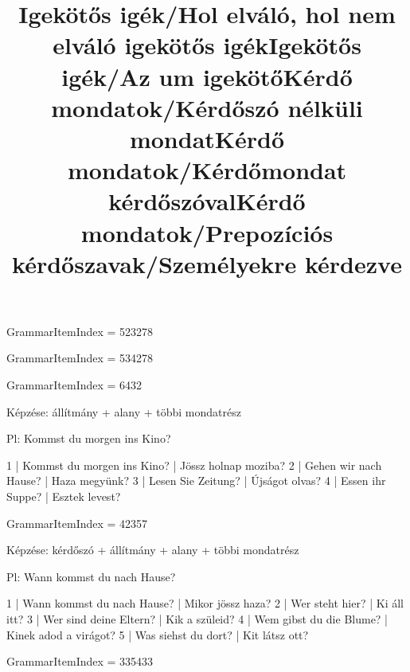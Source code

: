 \title{Igekötős igék/Hol elváló, hol nem elváló igekötős igék}

GrammarItemIndex = 523278

\begin{desc}
\end{desc}

\begin{exmp}
\end{exmp}

\title{Igekötős igék/Az um igekötő}

GrammarItemIndex = 534278

\begin{desc}
\end{desc}

\begin{exmp}
\end{exmp}

\title{Kérdő mondatok/Kérdőszó nélküli mondat}

GrammarItemIndex = 6432

\begin{desc}
Képzése: állítmány + alany + többi mondatrész

Pl: Kommst du morgen ins Kino?
\end{desc}

\begin{exmp}
1 | Kommst du morgen ins Kino? | Jössz holnap moziba?
2 | Gehen wir nach Hause? | Haza megyünk?
3 | Lesen Sie Zeitung? | Újságot olvas?
4 | Essen ihr Suppe? | Esztek levest?
\end{exmp}

\title{Kérdő mondatok/Kérdőmondat kérdőszóval}

GrammarItemIndex = 42357

\begin{desc}
Képzése: kérdőszó + állítmány + alany + többi mondatrész

Pl: Wann kommst du nach Hause?
\end{desc}

\begin{exmp}
1 | Wann kommst du nach Hause? | Mikor jössz haza?
2 | Wer steht hier? | Ki áll itt?
3 | Wer sind deine Eltern? | Kik a szüleid?
4 | Wem gibst du die Blume? | Kinek adod a virágot?
5 | Was siehst du dort? | Kit látsz ott?
\end{exmp}

\title{Kérdő mondatok/Prepozíciós kérdőszavak/Személyekre kérdezve}

GrammarItemIndex = 335433

